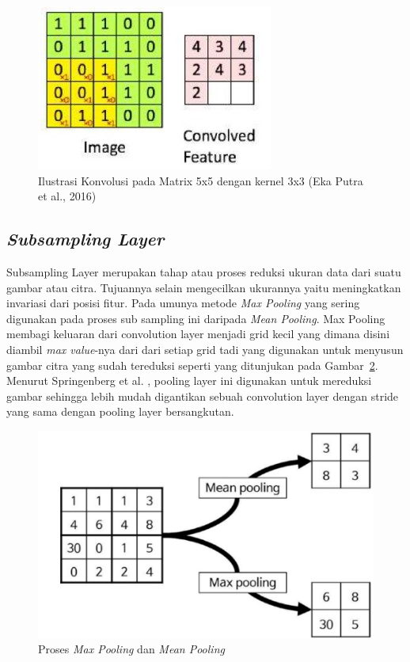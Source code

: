 \begin{figure}[ht]
    \centering
    \includegraphics[scale=1]{gambar/convolution_simulation.jpg}
    \caption{Ilustrasi Konvolusi pada Matrix 5x5 dengan kernel 3x3 (Eka Putra et al., 2016)}
    \label{fig:ilutrasikonvolusi}  
\end{figure}


\subsection{\emph{Subsampling Layer}}
\label{subsec:subsamplinglayer}

\par Subsampling Layer merupakan tahap atau proses reduksi ukuran data dari suatu gambar atau citra. Tujuannya selain mengecilkan
ukurannya yaitu meningkatkan invariasi dari posisi fitur. Pada umunya metode \emph{Max Pooling} yang sering digunakan pada proses sub sampling ini daripada \emph{Mean Pooling}.
Max Pooling membagi keluaran dari convolution layer menjadi grid kecil yang dimana disini diambil \emph{max value}-nya dari dari setiap grid
tadi yang digunakan untuk menyusun gambar citra yang sudah tereduksi seperti yang ditunjukan pada Gambar~\ref{fig:prosespooling}. Menurut Springenberg et al. \cite{springenberg2014striving}, pooling layer ini digunakan
untuk mereduksi gambar sehingga lebih mudah digantikan sebuah convolution layer dengan stride yang sama dengan pooling layer
bersangkutan\cite{putra2016klasifikasi}.

\begin{figure}[ht]
    \centering
    \includegraphics[scale=0.6]{gambar/pooling.jpg}
    \caption{Proses \emph{Max Pooling} dan \emph{Mean Pooling}}
    \label{fig:prosespooling}  
\end{figure}

